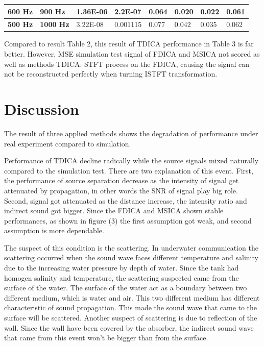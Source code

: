 \documentclass[a4paper]{jpconf}
\begin{document}
\begin{table}[h]
\begin{tabular}{|l|l|l|l|l|l|l|l|}
\textbf{600 Hz}                                          & \textbf{900 Hz}                                         & 1.36E-06                            & 2.2E-07                             & 0.064                               & 0.020                               & 0.022                               & 0.061                               \\ \hline
\textbf{500 Hz}                                          & \textbf{1000 Hz}                                        & 3.22E-08                            & 0.001115                            & 0.077                               & 0.042                               & 0.035                               & 0.062                               \\ \hline
\end{tabular}
\end{table}

Compared to result Table 2, this result of TDICA performance in Table 3 is far better. However, MSE simulation test signal of FDICA and MSICA not scored as well as methods TDICA. STFT process on the FDICA, causing the signal can not be reconstructed perfectly when turning ISTFT transformation.

\section{Discussion}
The result of three applied methods shows the degradation of performance under real experiment compared to simulation.

Performance of TDICA decline radically while the source signals mixed naturally compared to the simulation test.  There are two explanation of this event. First, the performance of source separation decrease as the intensity of signal get attenuated by propagation, in other words the SNR of signal play big role. Second, signal got attenuated as the distance increase, the intensity ratio and indirect sound got bigger. Since the FDICA and MSICA shown stable performances, as shown in figure (3) the first assumption got weak, and second assumption is more dependable.

The suspect of this condition is the scattering. In underwater communication the scattering occurred when the sound wave faces different temperature and salinity due to the increasing water pressure by depth of water. Since the tank had homogen salinity and temperature, the scattering suspected came from the surface of the water. The surface of the water act as a boundary between two different medium, which is water and air. This two different medium has different characteristic of sound propagation. This made the sound wave that came to the surface will be scattered. Another suspect of scattering is due to reflection of the wall. Since the wall have been covered by the absorber, the indirect sound wave that came from this event won’t be bigger than from the surface.
\end{document}

